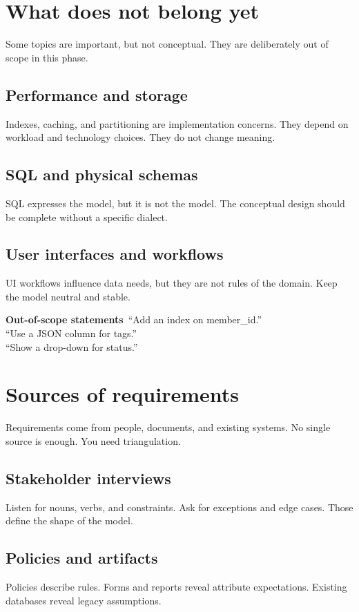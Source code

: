\section{What does not belong yet}
Some topics are important, but not conceptual.
They are deliberately out of scope in this phase.

\subsection{Performance and storage}
Indexes, caching, and partitioning are implementation concerns.
They depend on workload and technology choices.
They do not change meaning.

\subsection{SQL and physical schemas}
SQL expresses the model, but it is not the model.
The conceptual design should be complete without a specific dialect.

\subsection{User interfaces and workflows}
UI workflows influence data needs, but they are not rules of the domain.
Keep the model neutral and stable.

\begin{examplebox}
\textbf{Out-of-scope statements}\
“Add an index on member\_id.”\\
“Use a JSON column for tags.”\\
“Show a drop-down for status.”
\end{examplebox}

\section{Sources of requirements}
Requirements come from people, documents, and existing systems.
No single source is enough.
You need triangulation.

\subsection{Stakeholder interviews}
Listen for nouns, verbs, and constraints.
Ask for exceptions and edge cases.
Those define the shape of the model.

\subsection{Policies and artifacts}
Policies describe rules.
Forms and reports reveal attribute expectations.
Existing databases reveal legacy assumptions.

